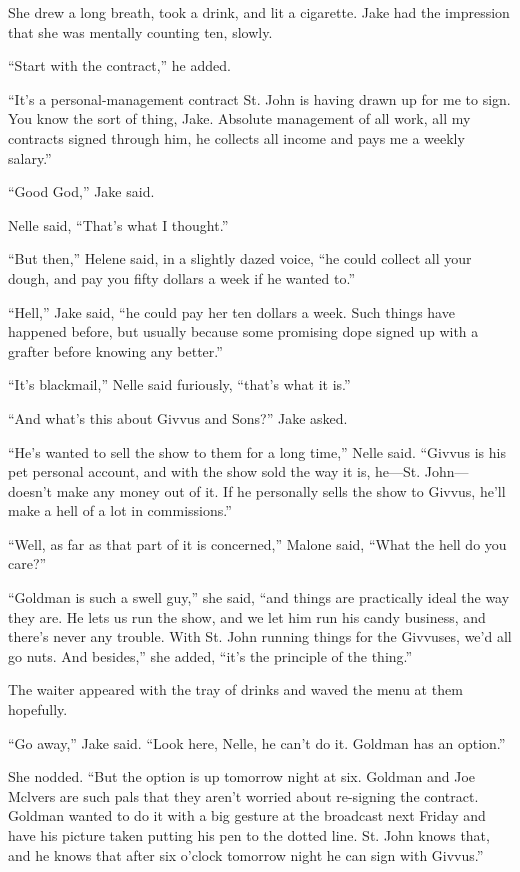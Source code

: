 \documentclass{novel}
\begin{document}
She drew a long breath, took a drink, and lit a cigarette. Jake had the impression that she was mentally counting ten, slowly.

“Start with the contract,” he added.

“It’s a personal-management contract St. John is having drawn up for me to sign. You know the sort of thing, Jake. Absolute management of all work, all my contracts signed through him, he collects all income and pays me a weekly salary.”

“Good God,” Jake said.

Nelle said, “That’s what I thought.”

“But then,” Helene said, in a slightly dazed voice, “he could collect all your dough, and pay you fifty dollars a week if he wanted to.”

“Hell,” Jake said, “he could pay her ten dollars a week. Such things have happened before, but usually because some promising dope signed up with a grafter before knowing any better.”

“It’s blackmail,” Nelle said furiously, “that’s what it is.”

“And what’s this about Givvus and Sons?” Jake asked.

“He’s wanted to sell the show to them for a long time,” Nelle said. “Givvus is his pet personal account, and with the show sold the way it is, he—St. John— doesn’t make any money out of it. If he personally sells the show to Givvus, he’ll make a hell of a lot in commissions.”

“Well, as far as that part of it is concerned,” Malone said, “What the hell do you care?”

“Goldman is such a swell guy,” she said, “and things are practically ideal the way they are. He lets us run the show, and we let him run his candy business, and there’s never any trouble. With St. John running things for the Givvuses, we’d all go nuts. And besides,” she added, “it’s the principle of the thing.”

The waiter appeared with the tray of drinks and waved the menu at them hopefully.

“Go away,” Jake said. “Look here, Nelle, he can’t do it. Goldman has an option.”

She nodded. “But the option is up tomorrow night at six. Goldman and Joe Mclvers are such pals that they aren’t worried about re-signing the contract. Goldman wanted to do it with a big gesture at the broadcast next Friday and have his picture taken putting his pen to the dotted line. St. John knows that, and he knows that after six o’clock tomorrow night he can sign with Givvus.”
\end{document}
